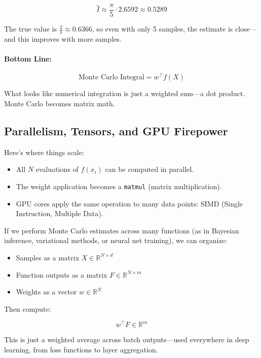 \[
\hat{I} \approx \frac{\pi}{5} \cdot 2.6592 \approx 0.5289
\]

The true value is \( \frac{2}{\pi} \approx 0.6366 \), so even with only 5 samples, the estimate is close—and this improves with more samples.

\paragraph{Bottom Line:}

\[
\text{Monte Carlo Integral} = w^\top f(X)
\]

What looks like numerical integration is just a weighted sum—a dot product. Monte Carlo becomes matrix math.





\subsection{Parallelism, Tensors, and GPU Firepower}

Here’s where things scale:

\begin{itemize}
  \item All \( N \) evaluations of \( f(x_i) \) can be computed in parallel.
  \item The weight application becomes a \texttt{matmul} (matrix multiplication).
  \item GPU cores apply the same operation to many data points: SIMD (Single Instruction, Multiple Data).
\end{itemize}

If we perform Monte Carlo estimates across many functions (as in Bayesian inference, variational methods, or neural net training), we can organize:

\begin{itemize}
  \item Samples as a matrix \( X \in \mathbb{R}^{N \times d} \)
  \item Function outputs as a matrix \( F \in \mathbb{R}^{N \times m} \)
  \item Weights as a vector \( w \in \mathbb{R}^{N} \)
\end{itemize}

Then compute:

\[
w^\top F \in \mathbb{R}^m
\]

This is just a weighted average across batch outputs—used everywhere in deep learning, from loss functions to layer aggregation.



